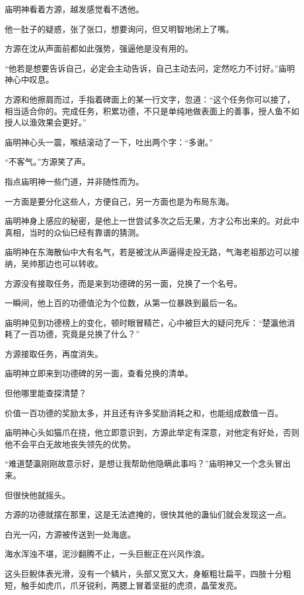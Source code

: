 \begin{this_body}
庙明神看着方源，越发感觉看不透他。

他一肚子的疑惑，张了张口，想要询问，但又明智地闭上了嘴。

方源在沈从声面前都如此强势，强逼他是没有用的。

“他若是想要告诉自己，必定会主动告诉，自己主动去问，定然吃力不讨好。”庙明神心中叹息。

方源和他擦肩而过，手指着碑面上的某一行文字，忽道：“这个任务你可以接了，相当适合你的。完成任务，积累功德，不只是单纯地做表面上的善事，授人鱼不如授人以渔效果会更好。”

庙明神心头一震，喉结滚动了一下，吐出两个字：“多谢。”

“不客气。”方源笑了声。

指点庙明神一些门道，并非随性而为。

一方面是要分化这些人，方便自己，另一方面也是为布局东海。

庙明神身上感应的秘密，是他上一世尝试多次之后无果，方才公布出来的。对此中真相，当时的众仙已经有靠谱的猜测。

庙明神在东海散仙中大有名气，若是被沈从声逼得走投无路，气海老祖那边可以接纳，吴帅那边也可以转收。

方源没有接取任务，而是来到功德碑的另一面，兑换了一个名号。

一瞬间，他上百的功德值沦为个位数，从第一位暴跌到最后一名。

庙明神见到功德榜上的变化，顿时眼冒精芒，心中被巨大的疑问充斥：“楚瀛他消耗了一百功德，究竟是兑换了什么？”

方源接取任务，再度消失。

庙明神立即来到功德碑的另一面，查看兑换的清单。

但他哪里能查探清楚？

价值一百功德的奖励太多，并且还有许多奖励消耗之和，也能组成数值一百。

庙明神心头如猫爪在挠，他立即意识到，方源此举定有深意，对他定有好处，否则他不会平白无故地丧失领先的优势。

“难道楚瀛刚刚故意示好，是想让我帮助他隐瞒此事吗？”庙明神又一个念头冒出来。

但很快他就摇头。

方源的功德就摆在那里，这是无法遮掩的，很快其他的蛊仙们就会发现这一点。

白光一闪，方源被传送到一处海底。

海水浑浊不堪，泥沙翻腾不止，一头巨鲵正在兴风作浪。

这头巨鲵体表光滑，没有一个鳞片，头部又宽又大，身躯粗壮扁平，四肢十分粗短，触手如虎爪，爪牙锐利，两腮上冒着坚挺的虎须，晶莹发亮。


\end{this_body}
